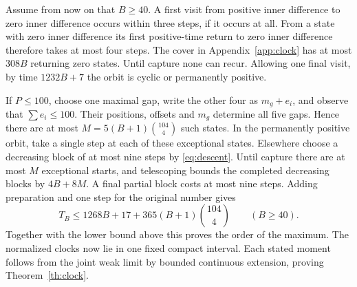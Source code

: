 \documentclass[11pt,reqno]{amsart}
\begin{document}
Assume from now on that $B\ge40$. A first visit from positive inner
difference to zero inner difference occurs within three steps, if it occurs at
all. From a state with zero inner difference its first positive-time return to
zero inner difference therefore takes at most four steps. The cover in
Appendix~\ref{app:clock} has at most $308B$ returning zero states. Until
capture none can recur. Allowing one final visit, by time $1232B+7$
the orbit is cyclic or permanently positive.

If $P\le100$, choose one maximal gap, write the other four as $m_g+e_i$,
and observe that $\sum e_i\le100$. Their positions, offsets and $m_g$
determine all five gaps. Hence there are at most $M=5(B+1)\binom{104}{4}$
such states. In the permanently positive orbit, take a single step at
each of these exceptional states. Elsewhere choose a decreasing block
of at most nine steps by \eqref{eq:descent}. Until capture there are at
most $M$ exceptional starts, and telescoping bounds the completed
decreasing blocks by $4B+8M$. A final partial block costs at most nine
steps. Adding preparation and one step for the original number gives
\[
 T_B\le1268B+17+365(B+1)\binom{104}{4}\qquad(B\ge40).
\]
Together with the lower bound above this proves the order of the maximum.
The normalized clocks now lie in one fixed compact interval. Each stated
moment follows from the joint weak limit by bounded continuous extension,
proving Theorem~\ref{th:clock}.
\end{document}
